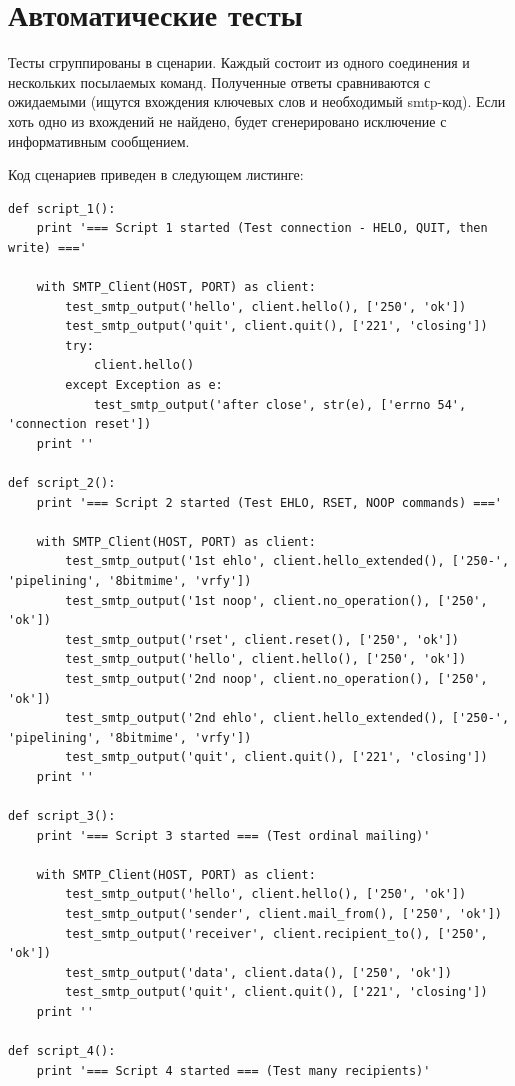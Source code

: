 \documentclass[a4paper,12pt]{report}
\begin{document}
\section{Автоматические тесты}

Тесты сгруппированы в сценарии. Каждый состоит из одного соединения и нескольких посылаемых команд. Полученные ответы сравниваются с ожидаемыми (ищутся вхождения ключевых слов и необходимый smtp-код). Если хоть одно из вхождений не найдено, будет сгенерировано исключение с информативным сообщением.

Код сценариев приведен в следующем листинге:

\begin{verbatim}
def script_1():
    print '=== Script 1 started (Test connection - HELO, QUIT, then write) ==='

    with SMTP_Client(HOST, PORT) as client:
        test_smtp_output('hello', client.hello(), ['250', 'ok'])
        test_smtp_output('quit', client.quit(), ['221', 'closing'])
        try:
            client.hello()
        except Exception as e:
            test_smtp_output('after close', str(e), ['errno 54', 'connection reset'])
    print ''

def script_2():
    print '=== Script 2 started (Test EHLO, RSET, NOOP commands) ==='

    with SMTP_Client(HOST, PORT) as client:
        test_smtp_output('1st ehlo', client.hello_extended(), ['250-', 'pipelining', '8bitmime', 'vrfy'])
        test_smtp_output('1st noop', client.no_operation(), ['250', 'ok'])
        test_smtp_output('rset', client.reset(), ['250', 'ok'])
        test_smtp_output('hello', client.hello(), ['250', 'ok'])
        test_smtp_output('2nd noop', client.no_operation(), ['250', 'ok'])
        test_smtp_output('2nd ehlo', client.hello_extended(), ['250-', 'pipelining', '8bitmime', 'vrfy'])
        test_smtp_output('quit', client.quit(), ['221', 'closing'])
    print ''

def script_3():
    print '=== Script 3 started === (Test ordinal mailing)'

    with SMTP_Client(HOST, PORT) as client:
        test_smtp_output('hello', client.hello(), ['250', 'ok'])
        test_smtp_output('sender', client.mail_from(), ['250', 'ok'])
        test_smtp_output('receiver', client.recipient_to(), ['250', 'ok'])
        test_smtp_output('data', client.data(), ['250', 'ok'])
        test_smtp_output('quit', client.quit(), ['221', 'closing'])
    print ''

def script_4():
    print '=== Script 4 started === (Test many recipients)'


\end{verbatim}
\end{document}
